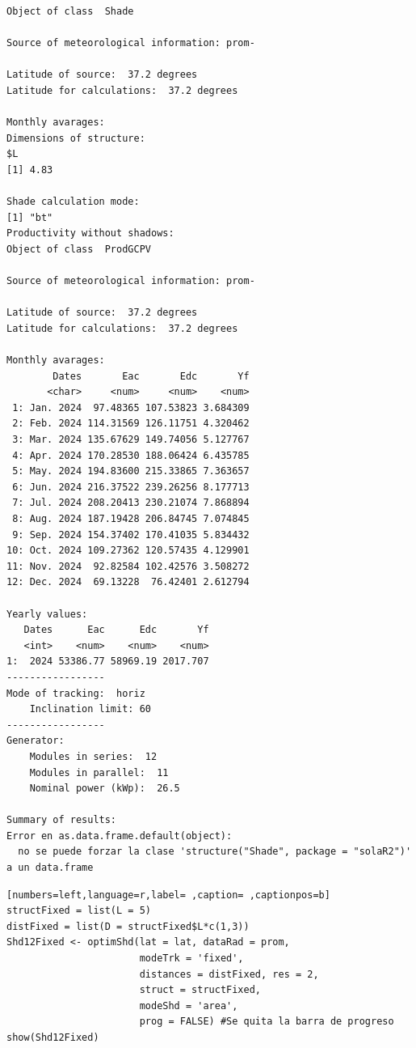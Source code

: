 \begin{verbatim}
Object of class  Shade 

Source of meteorological information: prom- 

Latitude of source:  37.2 degrees
Latitude for calculations:  37.2 degrees

Monthly avarages:
Dimensions of structure:
$L
[1] 4.83

Shade calculation mode:
[1] "bt"
Productivity without shadows:
Object of class  ProdGCPV 

Source of meteorological information: prom- 

Latitude of source:  37.2 degrees
Latitude for calculations:  37.2 degrees

Monthly avarages:
        Dates       Eac       Edc       Yf
       <char>     <num>     <num>    <num>
 1: Jan. 2024  97.48365 107.53823 3.684309
 2: Feb. 2024 114.31569 126.11751 4.320462
 3: Mar. 2024 135.67629 149.74056 5.127767
 4: Apr. 2024 170.28530 188.06424 6.435785
 5: May. 2024 194.83600 215.33865 7.363657
 6: Jun. 2024 216.37522 239.26256 8.177713
 7: Jul. 2024 208.20413 230.21074 7.868894
 8: Aug. 2024 187.19428 206.84745 7.074845
 9: Sep. 2024 154.37402 170.41035 5.834432
10: Oct. 2024 109.27362 120.57435 4.129901
11: Nov. 2024  92.82584 102.42576 3.508272
12: Dec. 2024  69.13228  76.42401 2.612794

Yearly values:
   Dates      Eac      Edc       Yf
   <int>    <num>    <num>    <num>
1:  2024 53386.77 58969.19 2017.707
-----------------
Mode of tracking:  horiz 
    Inclination limit: 60 
-----------------
Generator:
    Modules in series:  12 
    Modules in parallel:  11 
    Nominal power (kWp):  26.5 

Summary of results:
Error en as.data.frame.default(object): 
  no se puede forzar la clase 'structure("Shade", package = "solaR2")' a un data.frame
\end{verbatim}

\begin{lstlisting}[numbers=left,language=r,label= ,caption= ,captionpos=b]
structFixed = list(L = 5)
distFixed = list(D = structFixed$L*c(1,3))
Shd12Fixed <- optimShd(lat = lat, dataRad = prom,
                       modeTrk = 'fixed',
                       distances = distFixed, res = 2,
                       struct = structFixed,
                       modeShd = 'area',
                       prog = FALSE) #Se quita la barra de progreso
show(Shd12Fixed)
\end{lstlisting}

